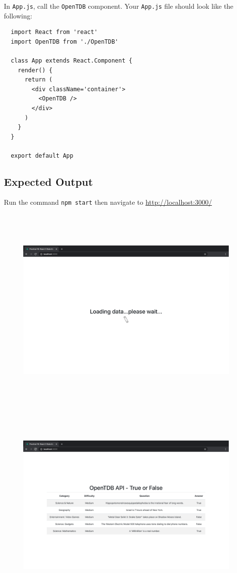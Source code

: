 \documentclass{article}
\begin{document}
In \texttt{App.js}, call the \texttt{OpenTDB} component. Your \texttt{App.js} file should look like the following:

\begin{verbatim}
  import React from 'react'
  import OpenTDB from './OpenTDB'

  class App extends React.Component {
    render() {
      return (
        <div className='container'>
          <OpenTDB />
        </div>
      )
    }
  }

  export default App
\end{verbatim}

\subsection*{Expected Output} 
Run the command \texttt{npm start} then navigate to \href{http://localhost:3000/}{http://localhost:3000/} \\

\begin{figure}[H]
  \includegraphics[width=175mm, height=105mm]{./img/18-expected-opentdb-1.png}
  \includegraphics[width=175mm, height=105mm]{./img/18-expected-opentdb-2.png}
\end{figure}
\end{document}
